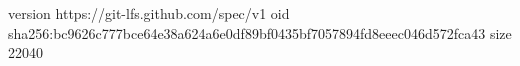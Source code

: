 version https://git-lfs.github.com/spec/v1
oid sha256:bc9626c777bce64e38a624a6e0df89bf0435bf7057894fd8eeec046d572fca43
size 22040
